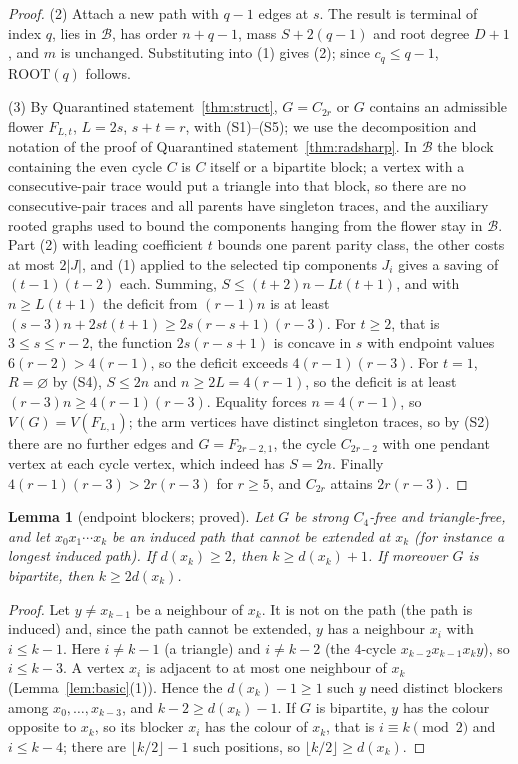 \documentclass[11pt]{amsart}
\newtheorem{lemma}[theorem]{Lemma}
\theoremstyle{definition}
\theoremstyle{remark}
\newcommand{\ROOT}{\mathrm{ROOT}}
\begin{document}
\begin{proof}
(2) Attach a new path with $q-1$ edges at $s$. The result is terminal of index $q$, lies in $\mathcal B$, has order $n+q-1$, mass $S+2(q-1)$ and root degree $D+1$, and $m$ is unchanged. Substituting into (1) gives (2); since $c_q\le q-1$, $\ROOT(q)$ follows.

(3) By Quarantined statement~\ref{thm:struct}, $G=C_{2r}$ or $G$ contains an admissible flower $F_{L,t}$, $L=2s$, $s+t=r$, with (S1)--(S5); we use the decomposition and notation of the proof of Quarantined statement~\ref{thm:radsharp}. In $\mathcal B$ the block containing the even cycle $C$ is $C$ itself or a bipartite block; a vertex with a consecutive-pair trace would put a triangle into that block, so there are no consecutive-pair traces and all parents have singleton traces, and the auxiliary rooted graphs used to bound the components hanging from the flower stay in $\mathcal B$. Part (2) with leading coefficient $t$ bounds one parent parity class, the other costs at most $2|J|$, and (1) applied to the selected tip components $J_i$ gives a saving of $(t-1)(t-2)$ each. Summing, $S\le(t+2)n-Lt(t+1)$, and with $n\ge L(t+1)$ the deficit from $(r-1)n$ is at least $(s-3)n+2st(t+1)\ge2s(r-s+1)(r-3)$. For $t\ge2$, that is $3\le s\le r-2$, the function $2s(r-s+1)$ is concave in $s$ with endpoint values $6(r-2)>4(r-1)$, so the deficit exceeds $4(r-1)(r-3)$. For $t=1$, $R=\varnothing$ by (S4), $S\le2n$ and $n\ge2L=4(r-1)$, so the deficit is at least $(r-3)n\ge4(r-1)(r-3)$. Equality forces $n=4(r-1)$, so $V(G)=V(F_{L,1})$; the arm vertices have distinct singleton traces, so by (S2) there are no further edges and $G=F_{2r-2,1}$, the cycle $C_{2r-2}$ with one pendant vertex at each cycle vertex, which indeed has $S=2n$. Finally $4(r-1)(r-3)>2r(r-3)$ for $r\ge5$, and $C_{2r}$ attains $2r(r-3)$.
\end{proof}

\begin{lemma}[endpoint blockers; proved]\label{lem:blockers}
Let $G$ be strong $C_4$-free and triangle-free, and let $x_0x_1\cdots x_k$ be an induced path that cannot be extended at $x_k$ \textup{(}for instance a longest induced path\textup{)}. If $d(x_k)\ge2$, then $k\ge d(x_k)+1$. If moreover $G$ is bipartite, then $k\ge2d(x_k)$.
\end{lemma}

\begin{proof}
Let $y\ne x_{k-1}$ be a neighbour of $x_k$. It is not on the path (the path is induced) and, since the path cannot be extended, $y$ has a neighbour $x_i$ with $i\le k-1$. Here $i\ne k-1$ (a triangle) and $i\ne k-2$ (the $4$-cycle $x_{k-2}x_{k-1}x_ky$), so $i\le k-3$. A vertex $x_i$ is adjacent to at most one neighbour of $x_k$ (Lemma~\ref{lem:basic}(1)). Hence the $d(x_k)-1\ge1$ such $y$ need distinct blockers among $x_0,\dots,x_{k-3}$, and $k-2\ge d(x_k)-1$. If $G$ is bipartite, $y$ has the colour opposite to $x_k$, so its blocker $x_i$ has the colour of $x_k$, that is $i\equiv k\pmod 2$ and $i\le k-4$; there are $\lfloor k/2\rfloor-1$ such positions, so $\lfloor k/2\rfloor\ge d(x_k)$.
\end{proof}
\end{document}
